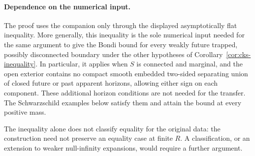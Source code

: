 \paragraph{Dependence on the numerical input.}\label{sec:conditional}
The proof uses the companion only through the displayed asymptotically
flat inequality. More generally, this inequality is the sole numerical
input needed for the same argument to give the Bondi bound for every weakly future trapped,
possibly disconnected boundary under the other hypotheses of
Corollary~\ref{cor:cks-inequality}. In particular, it applies when $S$
is connected and marginal, and the open exterior contains no compact
smooth embedded two-sided separating union of closed future or past
apparent horizons, allowing either sign on each component. These
additional horizon conditions are not needed for the transfer.
The Schwarzschild examples below satisfy them and attain the bound
at every positive mass.

The inequality alone does not classify equality for the original data:
the construction need not preserve an equality case at finite $R$.
A classification, or an extension to weaker null-infinity expansions,
would require a further argument.
